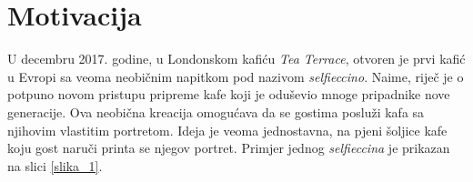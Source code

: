 \documentclass[12pt]{article}
\begin{document}






%





\section{Motivacija}
U decembru 2017. godine, u Londonskom kafi\'cu \textit{Tea Terrace}, otvoren je prvi kafi\'c u Evropi sa veoma neobi\v{c}nim napitkom pod nazivom \textit{selfieccino}. Naime, rije\v{c} je o potpuno novom pristupu pripreme kafe koji je odu\v{s}evio mnoge pripadnike nove generacije. Ova neobi\v{c}na kreacija omogu\'cava da se gostima poslu\v{z}i kafa sa njihovim vlastitim portretom. Ideja je veoma jednostavna, na pjeni \v{s}oljice kafe koju gost naru\v{c}i printa se njegov portret. Primjer jednog \textit{selfieccina} je prikazan na slici \ref{slika_1}.
\end{document}
